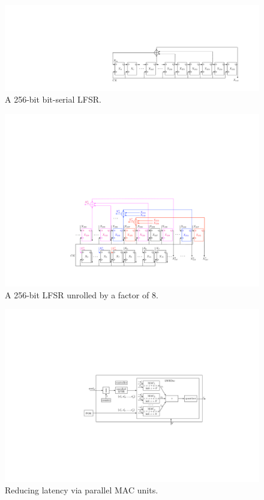 \begin{figure}[t!]
\centering
\includegraphics[width = 1.0\linewidth]{./figs/lfsr_baseline_compressed}
\caption{A 256-bit bit-serial LFSR.}
\label{fig:lfsr_baseline}
\end{figure}

\begin{figure}[t!]
\centering
\includegraphics[width = 1.0\linewidth]{./figs/lfsr_unrolled_compressed}
\caption{A 256-bit LFSR unrolled by a factor of 8.}
\label{fig:lfsr_unrolled}
\end{figure}

\begin{figure}[t!]
\centering
\includegraphics[width = 1.0\linewidth]{./figs/lpuf_p2_large}
\caption{Reducing latency via parallel MAC units.}
\label{fig:lpuf_p2}
\end{figure}

